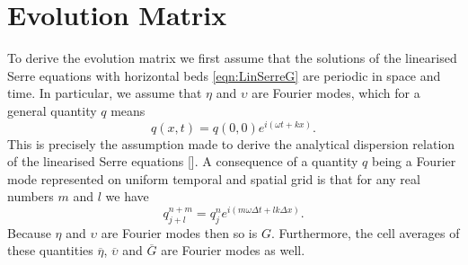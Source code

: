 \section{Evolution Matrix}
To derive the evolution matrix we first assume that the solutions of the linearised Serre equations with horizontal beds \eqref{eqn:LinSerreG} are periodic in space and time. In particular, we assume that $\eta$ and $\upsilon$ are Fourier modes, which for a general quantity $q$ means
\begin{equation}
q(x,t) = q(0,0) e^{i\left(\omega t + kx\right)}.
\label{eqn:FourierNode}
\end{equation}
This is precisely the assumption made to derive the analytical dispersion relation of the linearised Serre equations []. A consequence of a quantity $q$ being a Fourier mode represented on uniform temporal and spatial grid is that for any real numbers $m$ and $l$ we have
\begin{equation}
q^{n + m}_{j + l} = q^n_j e^{ i \left(m \omega \Delta t + l k \Delta x\right)}.
\label{eqn:fourierfactor}
\end{equation}
Because $\eta$ and $\upsilon$ are Fourier modes then so is $G$. Furthermore, the cell averages of these quantities $\overline{\eta}$, $\overline{\upsilon}$ and $\overline{G}$ are Fourier modes as well.

